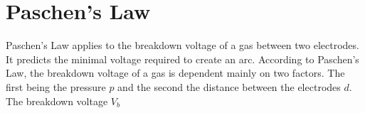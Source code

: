 \section{Paschen's Law}
Paschen's Law applies to the breakdown voltage of a gas between two electrodes. It predicts the minimal voltage required to create an arc. According to Paschen's Law, the breakdown voltage of a gas is dependent mainly on two factors. The first being the pressure $p$ and the second the distance between the electrodes $d$. The breakdown voltage $V_{b}$ 
